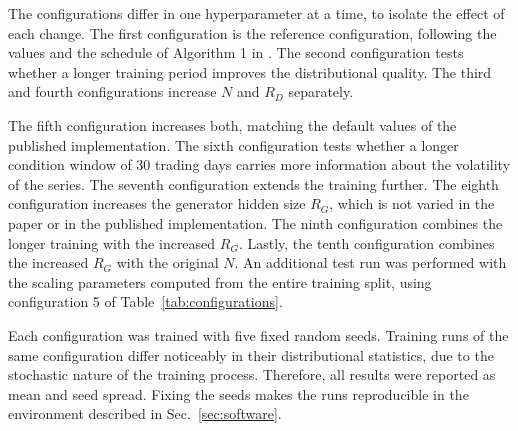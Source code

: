The configurations differ in one hyperparameter at a time, to isolate the effect of each change. The first configuration is the reference configuration, following the values and the schedule of Algorithm 1 in \textcite{vuleticFinGANForecastingClassifying2024}. The second configuration tests whether a longer training period improves the distributional quality. The third and fourth configurations increase $N$ and $R_D$ separately. 

The fifth configuration increases both, matching the default values of the published implementation. The sixth configuration tests whether a longer condition window of \num{30} trading days carries more information about the volatility of the series. The seventh configuration extends the training further. The eighth configuration increases the generator hidden size $R_G$, which is not varied in the paper or in the published implementation. The ninth configuration combines the longer training with the increased $R_G$. Lastly, the tenth configuration combines the increased $R_G$ with the original $N$. An additional test run was performed with the scaling parameters computed from the entire training split, using configuration \num{5} of Table~\ref{tab:configurations}.

Each configuration was trained with five fixed random seeds. Training runs of the same configuration differ noticeably in their distributional statistics, due to the stochastic nature of the training process. Therefore, all results were reported as mean and seed spread. Fixing the seeds makes the runs reproducible in the environment described in Sec.~\ref{sec:software}.
